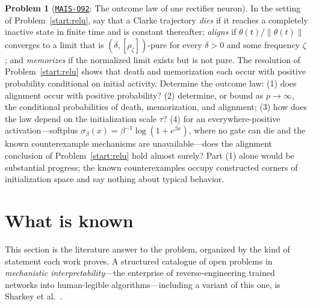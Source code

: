 \documentclass[11pt]{amsart}
\newcommand{\Oid}[1]{\href{https://github.com/lionellevine/MAIS/blob/main/open-problems/MAIS-O#1.md}{\texttt{MAIS-O#1}}}
\theoremstyle{plain}
\theoremstyle{definition}
\newtheorem{problem}[theorem]{Problem}
\begin{document}
\begin{problem}[\Oid{92}: The outcome law of one rectifier neuron]\label{start:outcome}
In the setting of Problem~\ref{start:relu}, say that a Clarke trajectory \emph{dies} if it reaches a completely inactive state in finite time and is constant thereafter; \emph{aligns} if $\theta(t)/\|\theta(t)\|$ converges to a limit that is $(\delta,[\rho_\zeta])$-pure for every $\delta>0$ and some frequency $\zeta$; and \emph{memorizes} if the normalized limit exists but is not pure. The resolution of Problem~\ref{start:relu} shows that death and memorization each occur with positive probability conditional on initial activity. Determine the outcome law:
(1) does alignment occur with positive probability?
(2) determine, or bound as $p \to \infty$, the conditional probabilities of death, memorization, and alignment;
(3) how does the law depend on the initialization scale $\tau$?
(4) for an everywhere-positive activation---softplus $\sigma_\beta(x) = \beta^{-1}\log(1+e^{\beta x})$, where no gate can die and the known counterexample mechanisms are unavailable---does the alignment conclusion of Problem~\ref{start:relu} hold almost surely?
Part (1) alone would be substantial progress; the known counterexamples occupy constructed corners of initialization space and say nothing about typical behavior.
\end{problem}

\section{What is known}\label{sec:known}

This section is the literature answer to the problem, organized by the kind of statement each work proves. A structured catalogue of open problems in \emph{mechanistic interpretability}---the enterprise of reverse-engineering trained networks into human-legible algorithms---including a variant of this one, is Sharkey et al.~\cite{sharkey2025}.
\end{document}
